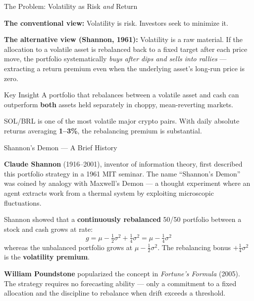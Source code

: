 \documentclass[aspectratio=169,10pt]{beamer}
\begin{document}
\begin{frame}{The Problem: Volatility as Risk \textit{and} Return}
\vspace{0.4em}
{\small\color{BodyText}
\textbf{The conventional view:} Volatility is risk. Investors seek to minimize it.

\textbf{The alternative view (Shannon, 1961):} Volatility is a raw material.
If the allocation to a volatile asset is rebalanced back to a fixed target after each price move,
the portfolio systematically \textit{buys after dips and sells into rallies} --- extracting a
return premium even when the underlying asset's long-run price is zero.

\vspace{0.5em}
\begin{block}{Key Insight}
A portfolio that rebalances between a volatile asset and cash
can outperform \textbf{both} assets held separately in choppy, mean-reverting markets.
\end{block}

\vspace{0.3em}
SOL/BRL is one of the most volatile major crypto pairs.
With daily absolute returns averaging \textbf{1--3\%}, the rebalancing premium is substantial.
}
\end{frame}

\begin{frame}{Shannon's Demon --- A Brief History}
\vspace{0.4em}
{\small\color{BodyText}
\textbf{Claude Shannon} (1916--2001), inventor of information theory, first described
this portfolio strategy in a 1961 MIT seminar. The name ``Shannon's Demon''
was coined by analogy with Maxwell's Demon --- a thought experiment where an agent
extracts work from a thermal system by exploiting microscopic fluctuations.

\vspace{0.3em}
Shannon showed that a \textbf{continuously rebalanced} 50/50 portfolio between
a stock and cash grows at rate:
\[
  g = \mu - \tfrac{1}{2}\sigma^2 + \tfrac{1}{4}\sigma^2
    = \mu - \tfrac{1}{4}\sigma^2
\]
whereas the unbalanced portfolio grows at $\mu - \tfrac{1}{2}\sigma^2$.
The rebalancing bonus $+\tfrac{1}{4}\sigma^2$ is the \textbf{volatility premium}.

\vspace{0.3em}
\textbf{William Poundstone} popularized the concept in \textit{Fortune's Formula} (2005).
The strategy requires no forecasting ability --- only a commitment to a fixed allocation
and the discipline to rebalance when drift exceeds a threshold.
}
\end{frame}
\end{document}
